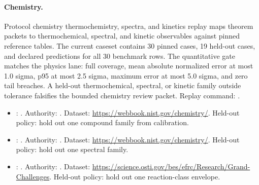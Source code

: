 \paragraph{Chemistry.}
Protocol chemistry thermochemistry, spectra, and kinetics replay
maps theorem packets to thermochemical, spectral, and kinetic observables
against pinned reference tables. The current caseset contains 30 pinned cases,
19 held-out cases, and declared predictions for all 30 benchmark rows. The
quantitative gate matches the physics lane: full coverage, mean absolute
normalized error at most 1.0 sigma, p95 at most 2.5 sigma, maximum error at
most 5.0 sigma, and zero tail breaches. A held-out thermochemical, spectral,
or kinetic family outside tolerance falsifies the bounded chemistry review packet.
Replay command:
.
\begin{itemize}[leftmargin=1.5em,nosep]
\item {}: . Authority: . Dataset: \url{https://webbook.nist.gov/chemistry/}. Held-out policy: hold out one compound family from calibration.
\item {}: . Authority: . Dataset: \url{https://webbook.nist.gov/chemistry/}. Held-out policy: hold out one spectral family.
\item {}: . Authority: . Dataset: \url{https://science.osti.gov/bes/efrc/Research/Grand-Challenges}. Held-out policy: hold out one reaction-class envelope.
\end{itemize}

